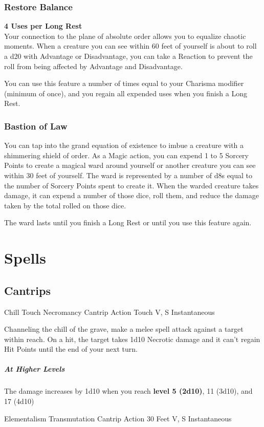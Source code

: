\documentclass[letterpaper,openany,oneside,twocolumn]{book}
\begin{document}
\subsubsection*{Restore Balance}
\textbf{4 Uses per Long Rest}\\
Your connection to the plane of absolute order allows you to equalize chaotic moments. When a creature you can see within 60 feet of yourself is about to roll a d20 with Advantage or Disadvantage, you can take a Reaction to prevent the roll from being affected by Advantage and Disadvantage.

You can use this feature a number of times equal to your Charisma modifier (minimum of once), and you regain all expended uses when you finish a Long Rest.
\subsubsection*{Bastion of Law}
You can tap into the grand equation of existence to imbue a creature with a shimmering shield of order. As a Magic action, you can expend 1 to 5 Sorcery Points to create a magical ward around yourself or another creature you can see within 30 feet of yourself. The ward is represented by a number of d8s equal to the number of Sorcery Points spent to create it. When the warded creature takes damage, it can expend a number of those dice, roll them, and reduce the damage taken by the total rolled on those dice.

The ward lasts until you finish a Long Rest or until you use this feature again.

\section*{Spells}
\subsection*{Cantrips}

\DndSpellHeader
  {Chill Touch}
  {Necromancy Cantrip}
  {Action}
  {Touch}
  {V, S}
  {Instantaneous}

Channeling the chill of the grave, make a melee spell attack against a target within reach. On a hit, the target takes 1d10 Necrotic damage and it can't regain Hit Points until the end of your next turn.

\subparagraph*{At Higher Levels} The damage increases by 1d10 when you reach \textbf{level 5 (2d10)}, 11 (3d10), and 17 (4d10)

\DndSpellHeader
  {Elementalism}
  {Transmutation Cantrip}
  {Action}
  {30 Feet}
  {V, S}
  {Instantaneous}
\end{document}
